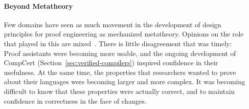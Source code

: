 
%


\paragraph{Beyond Metatheory} Few domains have seen as much movement
in the development of design principles for proof engineering as
mechanized metatheory. %
Opinions on the role that \poplmark played in this are mixed~\citep{piercenal, personappel}. There is little
disagreement that \poplmark was timely: Proof assistants were becoming
more usable, and the ongoing development of CompCert (Section~\ref{sec:verified-compilers})
inspired confidence in their usefulness. At the same time, the properties that researchers wanted to
prove about their languages were becoming larger and more complex. It
was becoming difficult to know that these properties were actually correct,
and to maintain confidence in correctness in the face of changes. 


